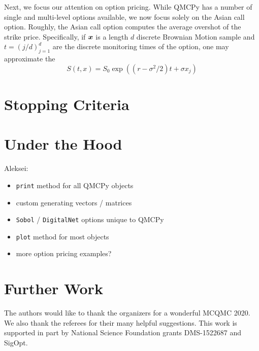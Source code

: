 \documentclass[graybox,footinfo]{svmult}
\newcommand{\AGSComment}[1]{{\color{cyan} Aleksei: #1}}
\begin{document}
Next, we focus our attention on option pricing. While QMCPy has a number of single and multi-level options available, we now focus solely on the Asian call option. Roughly, the  Asian call option computes the average overshot of the strike price. Specifically, if ${\boldsymbol{x}}$ is a length $d$ discrete Brownian Motion sample and $t = (j/d)_{j=1}^d$ are the discrete monitoring times of the option, one may approximate the 
$$S(t,x) = S_0 \exp((r-\sigma^2/2)t+\sigma x_j)$$

\section{Stopping Criteria}

%



\section{Under the Hood}

\AGSComment{
\begin{itemize}
    \item \texttt{print} method for all QMCPy objects
    \item custom generating vectors / matrices
    \item \texttt{Sobol} / \texttt{DigitalNet} options unique to QMCPy
    \item \texttt{plot} method for most objects
    \item more option pricing examples? 
\end{itemize}}

\section{Further Work} \label{sec:further}


\begin{acknowledgement}
The authors would like to thank the organizers for a wonderful MCQMC 2020. 
We also thank the referees for their many helpful suggestions.  This work is supported in part by National Science Foundation grants DMS-1522687 and SigOpt.


\end{acknowledgement}



\end{document}
